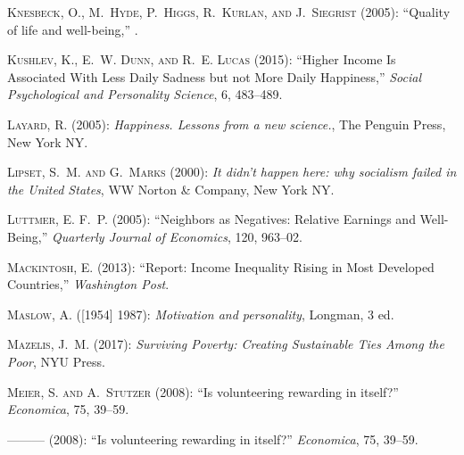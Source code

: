 \documentclass[10pt, letterpaper]{article}
\begin{document}
\begin{spacing}{1.4}
\begin{thebibliography}{91}
\textsc{Knesbeck, O., M.~Hyde, P.~Higgs, R.~Kurlan, and J.~Siegrist} (2005):
  \enquote{Quality of life and well-being,} .

\textsc{Kushlev, K., E.~W. Dunn, and R.~E. Lucas} (2015): \enquote{Higher
  Income Is Associated With Less Daily Sadness but not More Daily Happiness,}
  \emph{Social Psychological and Personality Science}, 6, 483--489.

\textsc{Layard, R.} (2005): \emph{Happiness. Lessons from a new science.}, The
  Penguin Press, New York NY.

\textsc{Lipset, S.~M. and G.~Marks} (2000): \emph{It didn't happen here: why
  socialism failed in the United States}, WW Norton \& Company, New York NY.

\textsc{Luttmer, E. F.~P.} (2005): \enquote{Neighbors as Negatives: Relative
  Earnings and Well-Being,} \emph{Quarterly Journal of Economics}, 120,
  963--02.

\textsc{Mackintosh, E.} (2013): \enquote{Report: Income Inequality Rising in
  Most Developed Countries,} \emph{Washington Post}.

\textsc{Maslow, A.} ([1954] 1987): \emph{{Motivation and personality}},
  Longman, 3 ed.

\textsc{Mazelis, J.~M.} (2017): \emph{Surviving Poverty: Creating Sustainable
  Ties Among the Poor}, NYU Press.

\textsc{Meier, S. and A.~Stutzer} (2008{}): \enquote{Is
  volunteering rewarding in itself?} \emph{Economica}, 75, 39--59.

---\hspace{-.1pt}---\hspace{-.1pt}--- (2008{}): \enquote{Is
  volunteering rewarding in itself?} \emph{Economica}, 75, 39--59.


\end{thebibliography}
\end{spacing}
\end{document}

